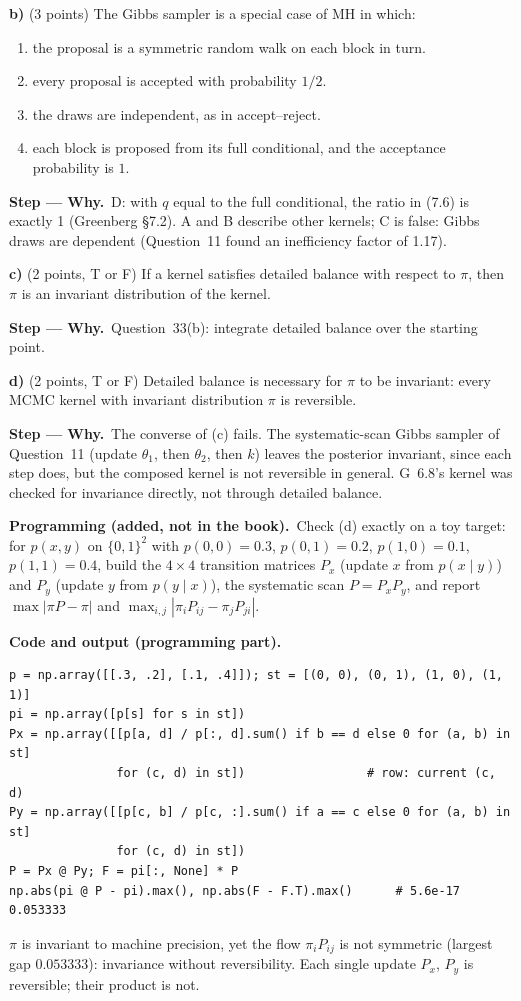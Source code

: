 \documentclass[11pt,a4paper]{article}
\newif\ifsolucoes
\numberwithin{equation}{questao}   %
\newcommand{\programacao}{\par\smallskip\noindent\textbf{Programming (added, not in the book).}~}
\newenvironment{alternativas}{\begin{enumerate}[label=\Alph*.,leftmargin=2.2em,topsep=1pt]}{\end{enumerate}}
\newcommand{\gabarito}[1]{\ifsolucoes\par\noindent\textbf{Key:}~#1\fi}
\newcommand{\passo}[2]{\par\smallskip\noindent\textbf{Step --- #1.}~#2}
\newcommand{\codehead}{\par\smallskip\noindent\textbf{Code and output (programming part).}\par}
\newcommand{\1}{\mathbf{1}}
\begin{document}
\textbf{b)} (3 points) The Gibbs sampler is a special case of MH in which:
\begin{alternativas}
\item the proposal is a symmetric random walk on each block in turn.
\item every proposal is accepted with probability $1/2$.
\item the draws are independent, as in accept--reject.
\item each block is proposed from its full conditional, and the acceptance probability is $1$.
\end{alternativas}
\gabarito{D}
\begin{sol}
\passo{Why}{D: with $q$ equal to the full conditional, the ratio in (7.6) is exactly 1 (Greenberg
§7.2). A and B describe other kernels; C is false: Gibbs draws are dependent (Question~11 found an
inefficiency factor of 1.17).}
\end{sol}

\textbf{c)} (2 points, T or F) If a kernel satisfies detailed balance with respect to $\pi$, then
$\pi$ is an invariant distribution of the kernel.
\gabarito{T}
\begin{sol}
\passo{Why}{Question~33(b): integrate detailed balance over the starting point.}
\end{sol}

\textbf{d)} (2 points, T or F) Detailed balance is necessary for $\pi$ to be invariant: every
MCMC kernel with invariant distribution $\pi$ is reversible.
\gabarito{F}
\begin{sol}
\passo{Why}{The converse of (c) fails. The systematic-scan Gibbs sampler of Question~11 (update
$\theta_1$, then $\theta_2$, then $k$) leaves the posterior invariant, since each step does, but the
composed kernel is not reversible in general. G~6.8's kernel was checked for invariance directly,
not through detailed balance.}
\end{sol}

\programacao Check (d) exactly on a toy target: for $p(x,y)$ on $\{0,1\}^2$ with
$p(0,0)=0.3$, $p(0,1)=0.2$, $p(1,0)=0.1$, $p(1,1)=0.4$, build the $4\times4$ transition matrices
$P_x$ (update $x$ from $p(x\mid y)$) and $P_y$ (update $y$ from $p(y\mid x)$), the systematic scan
$P=P_xP_y$, and report $\max|\pi P-\pi|$ and $\max_{i,j}|\pi_iP_{ij}-\pi_jP_{ji}|$.
\begin{sol}
\codehead
{\small
\begin{verbatim}
p = np.array([[.3, .2], [.1, .4]]); st = [(0, 0), (0, 1), (1, 0), (1, 1)]
pi = np.array([p[s] for s in st])
Px = np.array([[p[a, d] / p[:, d].sum() if b == d else 0 for (a, b) in st]
               for (c, d) in st])                 # row: current (c, d)
Py = np.array([[p[c, b] / p[c, :].sum() if a == c else 0 for (a, b) in st]
               for (c, d) in st])
P = Px @ Py; F = pi[:, None] * P
np.abs(pi @ P - pi).max(), np.abs(F - F.T).max()      # 5.6e-17   0.053333
\end{verbatim}
}
$\pi$ is invariant to machine precision, yet the flow $\pi_iP_{ij}$ is not symmetric (largest gap
$0.053333$): invariance without reversibility. Each single update $P_x$, $P_y$ is reversible; their
product is not.
\end{sol}
\end{document}
